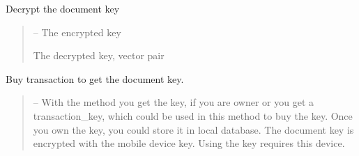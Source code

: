 \documentclass[letterpaper,10pt,english]{sphinxmanual}
\begin{document}
\begin{savenotes}
\begin{fulllineitems}
\begin{savenotes}
\begin{fulllineitems}
\begin{quote}
\begin{description}
\begin{itemize}
\end{itemize}

\end{description}\end{quote}

\end{fulllineitems}\end{savenotes}


\begin{savenotes}\begin{fulllineitems}
\label{\detokenize{eezz:eezz.document.TDocuments.decrypt_key_with_device}}
\pysigstartsignatures
{}
\pysigstopsignatures
\sphinxAtStartPar
Decrypt the document key
\begin{quote}\begin{description}
\sphinxAtStartPar
{} – The encrypted key

\sphinxAtStartPar
The decrypted key, vector pair

\end{description}\end{quote}

\end{fulllineitems}\end{savenotes}


\begin{savenotes}\begin{fulllineitems}
\label{\detokenize{eezz:eezz.document.TDocuments.eezz_buy_document}}
\pysigstartsignatures
{}
\pysigstopsignatures
\sphinxAtStartPar
Buy transaction to get the document key.
\begin{quote}\begin{description}
\sphinxAtStartPar
{} – With the method  you get the         key, if you are owner or you get a transaction\_key, which could be used in this method to buy the key. Once         you own the key, you could store it in local database.         The document key is encrypted with the mobile device key. Using the key requires this device.


\end{description}
\end{quote}
\end{fulllineitems}
\end{savenotes}
\end{fulllineitems}
\end{savenotes}
\end{document}
